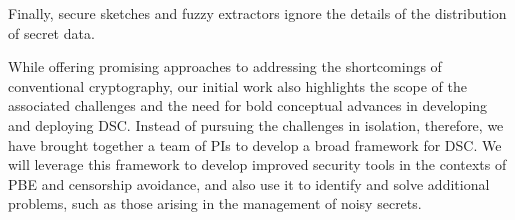 {Finally, secure
sketches and fuzzy extractors ignore the details of the distribution of secret
data. 


\fi

While offering promising approaches to addressing the shortcomings of
conventional cryptography, our initial work also highlights the scope of the associated
challenges and the need for bold conceptual advances in developing and
deploying DSC.  Instead of pursuing the challenges in isolation, therefore, we
have brought together a team of PIs to develop a broad framework for DSC. 
We will leverage this framework to develop improved security tools in the
contexts of PBE and censorship avoidance, and also use it to identify and solve
additional problems, such as those arising in the management of noisy
secrets.  

}
